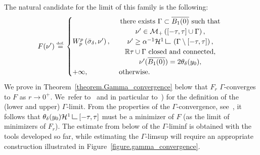 \documentclass[JEP,XML,SOM,Unicode,NoFloatCountersInSection,published]{cedram}
\theoremstyle{definition}
\newcommand{\eqdef}{\ensuremath{\stackrel{\mbox{\upshape\tiny def.}}{=}}}
\newcommand\LM[1]{\hbox{\vrule width.5pt \vbox to#1pt{\vfill \hrule width#1pt height.5pt}}}
\newcommand\LL{{\mathchoice {\>\LM7\>}{\>\LM7\>}{\,\LM5\,}{\,\LM{3.35}\,}}}
\newcommand{\mres}{\LL}
\newcommand\cH{\mathcal{H}}
\newcommand{\RR}{\mathbb{R}}
\begin{document}
The natural candidate for the limit of this family is the following:
\begin{equation}\label{Gamma_limitF}
F(\nu') \eqdef
\begin{cases}
W_p^p\left( \bar \sigma_{\delta}, \nu' \right),&
\begin{array}{c}
\text{there exists $\Gamma \subset \overline{B_1(0)}$ such that}\\
\nu' \in \mathcal{M}_+\left([-\tau, \tau] \cup \Gamma\right),
\\ \nu' \ge \alpha^{-1}\cH^1\mres \left(\Gamma\setminus[-\tau,\tau]\right),\\
\RR\tau \cup \Gamma \text{ closed and connected},\\ \nu'(\overline{B_1(0)}) = 2\theta_\delta(y_0),
\end{array} \\
+\infty,& \text{ otherwise.}
\end{cases}
\end{equation}
We prove in Theorem~\ref{theorem.Gamma_convergence} below that $F_r$ $\Gamma$-converges to $F$ as $r\to 0^+$. We~refer to~\cite{dal_maso_introduction_1993,braides_gamma-convergence_2002} and in particular to~\cite[Def.\,1.24]{braides_gamma-convergence_2002}) for the definition of the (lower and upper) $\Gamma$-limit. From the properties of the $\Gamma$-convergence, see~\cite[Cor.\,7.20]{dal_maso_introduction_1993}, it follows that $\theta_\delta(y_0)\cH^1\mres [-\tau, \tau]$ must be a minimizer of $F$ (as the limit of minimizers of $F_r$). The estimate from below of the $\Gamma$-liminf is obtained with the tools developed so far, while estimating the $\Gamma$-limsup will require an appropriate construction illustrated in Figure~\ref{figure.gamma_convergence}.
\end{document}
